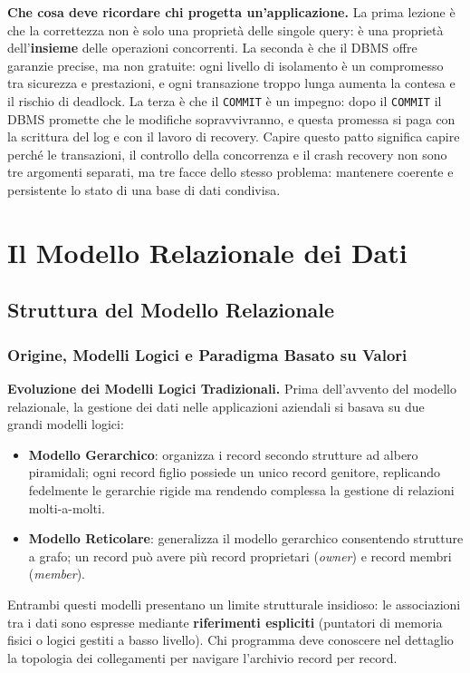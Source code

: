 \documentclass[12pt]{extarticle}
\begin{document}
\medskip
\noindent \textbf{Che cosa deve ricordare chi progetta un'applicazione.} La prima lezione è che la correttezza non è solo una proprietà delle singole query: è una proprietà dell'\textbf{insieme} delle operazioni concorrenti. La seconda è che il DBMS offre garanzie precise, ma non gratuite: ogni livello di isolamento è un compromesso tra sicurezza e prestazioni, e ogni transazione troppo lunga aumenta la contesa e il rischio di deadlock. La terza è che il \texttt{COMMIT} è un impegno: dopo il \texttt{COMMIT} il DBMS promette che le modifiche sopravvivranno, e questa promessa si paga con la scrittura del log e con il lavoro di recovery. Capire questo patto significa capire perché le transazioni, il controllo della concorrenza e il crash recovery non sono tre argomenti separati, ma tre facce dello stesso problema: mantenere coerente e persistente lo stato di una base di dati condivisa.

\newpage

\section{Il Modello Relazionale dei Dati}

\subsection{Struttura del Modello Relazionale}
\subsubsection{Origine, Modelli Logici e Paradigma Basato su Valori}
\noindent \textbf{Evoluzione dei Modelli Logici Tradizionali.} Prima dell'avvento del modello relazionale, la gestione dei dati nelle applicazioni aziendali si basava su due grandi modelli logici:
\begin{itemize}
    \item \textbf{Modello Gerarchico}: organizza i record secondo strutture ad albero piramidali; ogni record figlio possiede un unico record genitore, replicando fedelmente le gerarchie rigide ma rendendo complessa la gestione di relazioni molti-a-molti.
    \item \textbf{Modello Reticolare}: generalizza il modello gerarchico consentendo strutture a grafo; un record può avere più record proprietari (\textit{owner}) e record membri (\textit{member}).
\end{itemize}
Entrambi questi modelli presentano un limite strutturale insidioso: le associazioni tra i dati sono espresse mediante \textbf{riferimenti espliciti} (puntatori di memoria fisici o logici gestiti a basso livello). Chi programma deve conoscere nel dettaglio la topologia dei collegamenti per navigare l'archivio record per record.
\end{document}
